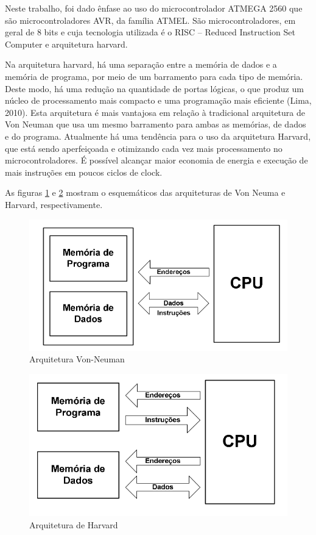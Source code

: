 \documentclass[
    12pt,               %
    oneside,%
    a4paper,            %
    english,            %
    french,             %
    spanish,            %
    brazil,             %
    ]{abntex2}
\begin{document}
   Neste trabalho, foi dado ênfase ao uso do microcontrolador ATMEGA 2560 que são microcontroladores AVR, da família ATMEL. São microcontroladores, em geral de 8 bits e cuja tecnologia utilizada é o RISC – Reduced Instruction Set Computer e arquitetura harvard. 


  Na arquitetura harvard, há uma separação entre a memória de dados e a memória de programa, por meio de um barramento para cada tipo de memória. Deste modo, há uma redução na quantidade de portas lógicas, o que produz um núcleo de processamento mais compacto e uma programação mais  eficiente (Lima, 2010). Esta arquitetura é mais vantajosa em relação à tradicional arquitetura de Von Neuman que usa um mesmo barramento para ambas as memórias, de dados e do programa. Atualmente há uma tendência para o uso da arquitetura Harvard, que está sendo aperfeiçoada e otimizando cada vez mais  processamento no microcontroladores. É possível alcançar maior economia de energia e execução de mais instruções em poucos ciclos de clock.



  As figuras \ref{fig:arquitetura_von_neuman} e \ref{fig:arquitetura_harvard} mostram o esquemáticos das arquiteturas de Von Neuma e Harvard, respectivamente.

  	\begin{figure}[tb]
	\centering 
	\includegraphics[width=0.5\columnwidth]{images/arquitetura_von_neuman} 
	\caption[Arquitetura Von-Neuman]{Arquitetura Von-Neuman}
	\label{fig:arquitetura_von_neuman} 
	\end{figure}

	\begin{figure}[tb]
	\centering 
	\includegraphics[width=0.5\columnwidth]{images/arquitetura_harvard} 
	\caption[Arquitetura Harvard]{Arquitetura de Harvard}
	\label{fig:arquitetura_harvard} 
	\end{figure}
\end{document}
